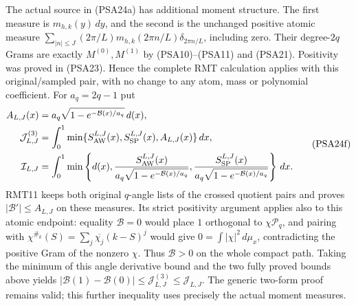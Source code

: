 The actual source in (PSA24a) has additional moment structure.
The first measure is $m_{h,k}(y)\,dy$, and the second is the
unchanged positive atomic measure
$\sum_{|n|\le J}(2\pi/L)m_{h,k}(2\pi n/L)\delta_{2\pi n/L}$,
including zero. Their degree-$2q$ Grams are exactly
$M^{(0)},M^{(1)}$ by (PSA10)--(PSA11) and (PSA21).
Positivity was proved in (PSA23). Hence the complete RMT
calculation applies with this original/sampled pair, with no
change to any atom, mass or polynomial coefficient.
For $a_q=2q-1$ put
\[
 \begin{aligned}
 A_{L,J}(x)&=a_q\sqrt{1-e^{-\mathcal B(x)/a_q}}\,d(x),\\
 \mathcal J^{(3)}_{L,J}&=\int_0^1
 \min\{S_{\rm AW}^{L,J}(x),S_{\rm SP}^{L,J}(x),A_{L,J}(x)\}\,dx,\\
 \mathcal I_{L,J}&=\int_0^1\min\left\{d(x),
 \frac{S_{\rm AW}^{L,J}(x)}{a_q\sqrt{1-e^{-\mathcal B(x)/a_q}}},
 \frac{S_{\rm SP}^{L,J}(x)}{a_q\sqrt{1-e^{-\mathcal B(x)/a_q}}}\right\}\,dx.
 \end{aligned}
 \tag{PSA24f}
\]
RMT11 keeps both original $q$-angle lists of the crossed quotient
pairs and proves $|\mathcal B'|\le A_{L,J}$ on these measures.
Its strict positivity argument applies also to this atomic
endpoint: equality $\mathcal B=0$ would place $1$ orthogonal to
$\chi\mathcal P_q$, and pairing with
$\chi^{\#_k}(S)=\sum_j\overline{\chi_j}(k-S)^j$ would give
$0=\int|\chi|^2\,d\mu_x$, contradicting the positive Gram of
the nonzero $\chi$. Thus $\mathcal B>0$ on the whole compact path.
Taking the minimum of this angle derivative bound and the two
fully proved bounds above yields
$|\mathcal B(1)-\mathcal B(0)|\le\mathcal J^{(3)}_{L,J}
\le\mathcal J_{L,J}$. The generic two-form proof remains valid;
this further inequality uses precisely the actual moment measures.

